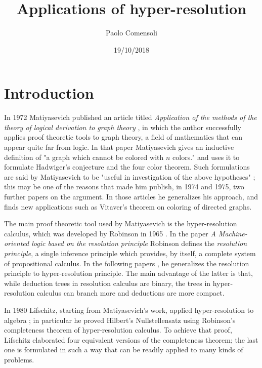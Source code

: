 \documentclass[a4paper,12pt,oneside]{book}
\title{Applications of hyper-resolution}
\author{Paolo Comensoli}
\date{19/10/2018}
\begin{document}
 

%



\setlength{\parskip}{-0.7mm} 
\setcounter{page}{1}
\tableofcontents
\thispagestyle{empty}
\newpage
\setlength{\parskip}{1mm} 



\chapter*{Introduction} %

In 1972 Matiyasevich published an article titled \textit{Application of the methods of the theory of logical derivation to graph theory} \cite{mat-2}, in which the author successfully applies proof theoretic tools to graph theory, a field of mathematics that can appear quite far from logic. 
In that paper Matiyasevich  gives an inductive definition of "a graph which cannot be colored with $n$ colors." and uses it to formulate  Hadwiger's conjecture and the four color theorem. 
Such formulations are said by  Matiyasevich to be "useful in investigation of the above hypotheses" \cite{mat-2}; this may be one of the reasons that made him publish, in 1974 and 1975, two further papers \cite{mat-3,mat-1} on the argument.
 In those articles he generalizes his approach, and finds new applications such as Vitaver's theorem on coloring of directed graphs.

The main proof theoretic tool used by Matiyasevich is the hyper-resolution calculus, which was developed by Robinson in 1965 \cite{robinson,rob,robinson-general}. 
In the paper \textit{A Machine-oriented logic based on the resolution principle} \cite{robinson} Robinson defines the \textit{resolution principle}, a single inference principle which provides, by itself, a complete system of propositional calculus.  
In the following papers  \cite{rob,robinson-general}, he generalizes the resolution principle to hyper-resolution principle. 
The main advantage of the latter  is that, while deduction trees in resolution calculus are binary, the trees in hyper-resolution calculus can branch more  and deductions are more compact.


\newpage\vspace*{1mm}
In 1980 Lifschitz, starting from Matiyasevich's work, applied hyper-resolution to algebra \cite{lifschitz}; in particular he proved Hilbert's Nullstellensatz using Robinson's completeness theorem of hyper-resolution calculus. 
To achieve that proof, Lifschitz elaborated four equivalent versions of the completeness theorem; the last one is formulated in such a way that can be readily applied to many kinds of problems.
\end{document}

